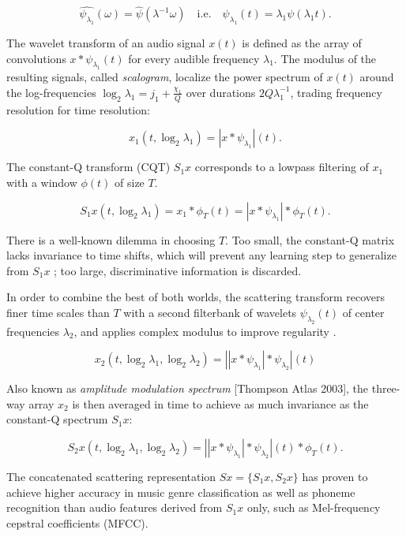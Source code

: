 \documentclass[twoside,a4paper]{article}
\begin{document}
\[
\widehat{\psi_{\lambda_{1}}}(\omega)=\widehat{\psi}(\lambda^{-1}\omega)
\quad\mathrm{i.e.}\quad
\psi_{\lambda_{1}}(t)=\lambda_{1}\psi(\lambda_{1}t).
\]

The wavelet transform of an audio signal $x(t)$ is defined as the array of convolutions $x \ast \psi_{\lambda_1}(t)$ for every audible frequency $\lambda_1$. The modulus of the resulting signals, called \emph{scalogram}, localize the power spectrum of $x(t)$ around the log-frequencies $\log_2 \lambda_1 = j_1 + \frac{\chi_1}{Q}$ over durations $2 Q \lambda_1^{-1}$, trading frequency resolution for time resolution:

\[
x_1 (t, \log_{2}\lambda_{1}) = \left| x \ast \psi_{\lambda_{1}} \right| (t).
\]

The constant-Q transform (CQT) $S_1 x$ corresponds to a lowpass filtering of $x_1$ with a window $\phi(t)$ of size $T$.

\[
S_1 x (t, \log_2 \lambda_1) = x_1 \ast \phi_T (t) = \left| x \ast \psi_{\lambda_{1}} \right| \ast \phi_T (t).
\]

There is a well-known dilemma in choosing $T$. Too small, the constant-Q matrix lacks invariance to time shifts, which will prevent any learning step to generalize from $S_1 x$ ; too large, discriminative information is discarded.

In order to combine the best of both worlds, the scattering transform recovers finer time scales than $T$ with a second filterbank of wavelets $\psi_{\lambda_2}(t)$ of center frequencies $\lambda_2$, and applies complex modulus to improve regularity \cite{Anden2014}.

\[
x_2 (t, \log_2 \lambda_1, \log_2 \lambda_2) =
\left| \left| x \ast \psi_{\lambda_{1}} \right|  \ast \psi_{\lambda_{2}} \right| (t) 
\]

Also known as \emph{amplitude modulation spectrum} [Thompson Atlas 2003], the three-way array $x_2$ is then averaged in time to achieve as much invariance as the constant-Q spectrum $S_1 x$:

\[
S_2 x (t, \log_2 \lambda_1, \log_2 \lambda_2) =
\left| \left| x \ast \psi_{\lambda_{1}} \right|  \ast \psi_{\lambda_{2}} \right| (t)  \ast \phi_T (t).
\]

The concatenated scattering representation $Sx = \{S_1 x, S_2 x \}$ has proven to achieve higher accuracy in music genre classification as well as phoneme recognition \cite{Anden2014} than audio features derived from $S_1 x$ only, such as Mel-frequency cepstral coefficients (MFCC).
\end{document}
